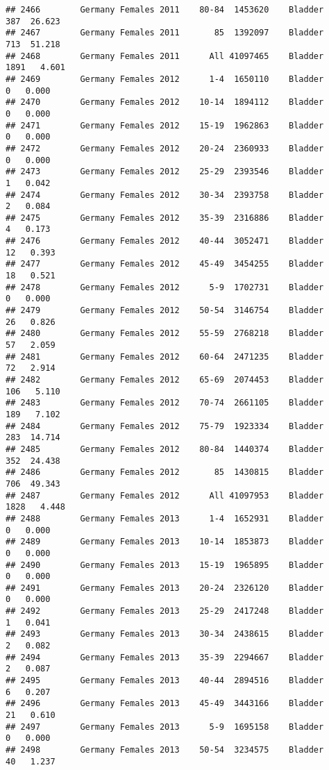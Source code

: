 \documentclass[
]{article}
\begin{document}
\begin{verbatim}
## 2466        Germany Females 2011    80-84  1453620    Bladder    387  26.623
## 2467        Germany Females 2011       85  1392097    Bladder    713  51.218
## 2468        Germany Females 2011      All 41097465    Bladder   1891   4.601
## 2469        Germany Females 2012      1-4  1650110    Bladder      0   0.000
## 2470        Germany Females 2012    10-14  1894112    Bladder      0   0.000
## 2471        Germany Females 2012    15-19  1962863    Bladder      0   0.000
## 2472        Germany Females 2012    20-24  2360933    Bladder      0   0.000
## 2473        Germany Females 2012    25-29  2393546    Bladder      1   0.042
## 2474        Germany Females 2012    30-34  2393758    Bladder      2   0.084
## 2475        Germany Females 2012    35-39  2316886    Bladder      4   0.173
## 2476        Germany Females 2012    40-44  3052471    Bladder     12   0.393
## 2477        Germany Females 2012    45-49  3454255    Bladder     18   0.521
## 2478        Germany Females 2012      5-9  1702731    Bladder      0   0.000
## 2479        Germany Females 2012    50-54  3146754    Bladder     26   0.826
## 2480        Germany Females 2012    55-59  2768218    Bladder     57   2.059
## 2481        Germany Females 2012    60-64  2471235    Bladder     72   2.914
## 2482        Germany Females 2012    65-69  2074453    Bladder    106   5.110
## 2483        Germany Females 2012    70-74  2661105    Bladder    189   7.102
## 2484        Germany Females 2012    75-79  1923334    Bladder    283  14.714
## 2485        Germany Females 2012    80-84  1440374    Bladder    352  24.438
## 2486        Germany Females 2012       85  1430815    Bladder    706  49.343
## 2487        Germany Females 2012      All 41097953    Bladder   1828   4.448
## 2488        Germany Females 2013      1-4  1652931    Bladder      0   0.000
## 2489        Germany Females 2013    10-14  1853873    Bladder      0   0.000
## 2490        Germany Females 2013    15-19  1965895    Bladder      0   0.000
## 2491        Germany Females 2013    20-24  2326120    Bladder      0   0.000
## 2492        Germany Females 2013    25-29  2417248    Bladder      1   0.041
## 2493        Germany Females 2013    30-34  2438615    Bladder      2   0.082
## 2494        Germany Females 2013    35-39  2294667    Bladder      2   0.087
## 2495        Germany Females 2013    40-44  2894516    Bladder      6   0.207
## 2496        Germany Females 2013    45-49  3443166    Bladder     21   0.610
## 2497        Germany Females 2013      5-9  1695158    Bladder      0   0.000
## 2498        Germany Females 2013    50-54  3234575    Bladder     40   1.237

\end{verbatim}
\end{document}
